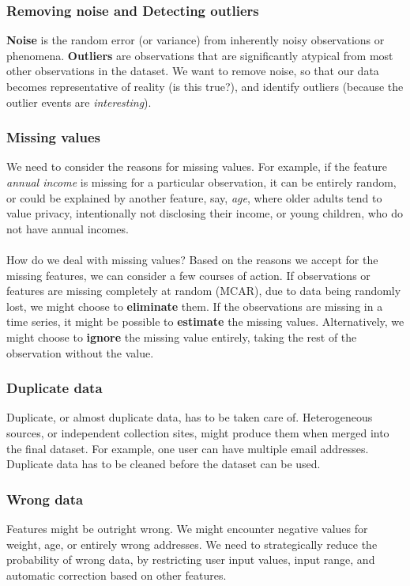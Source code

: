 \documentclass[9pt,twocolumn]{article}
\begin{document}
	\subsubsection*{Removing noise and Detecting outliers}
		\textbf{Noise} is the random error (or variance) from inherently noisy observations or phenomena. \textbf{Outliers} are observations that are significantly atypical from most other observations in the dataset.  We want to remove noise, so that our data becomes representative of reality (is this true?), and identify outliers (because the outlier events are \textit{interesting}).
	\subsubsection*{Missing values}
		We need to consider the reasons for missing values. For example, if the feature \textit{annual income} is missing for a particular observation, it can be entirely random, or could be explained by another feature, say, \textit{age}, where older adults tend to value privacy, intentionally not disclosing their income, or young children, who do not have annual incomes.\\
		\\
		How do we deal with missing values? Based on the reasons we accept for the missing features, we can consider a few courses of action. If observations or features are missing completely at random (MCAR), due to data being randomly lost, we might choose to \textbf{eliminate} them. If the observations are missing in a time series, it might be possible to \textbf{estimate} the missing values. Alternatively, we might choose to \textbf{ignore} the missing value entirely, taking the rest of the observation without the value.
	\subsubsection*{Duplicate data}
		Duplicate, or almost duplicate data, has to be taken care of. Heterogeneous sources, or independent collection sites, might produce them when merged into the final dataset. For example, one user can have multiple email addresses. Duplicate data has to be cleaned before the dataset can be used.
	\subsubsection*{Wrong data}
		Features might be outright wrong. We might encounter negative values for weight, age, or entirely wrong addresses. We need to strategically reduce the probability of wrong data, by restricting user input values, input range, and automatic correction based on other features.
\end{document}
